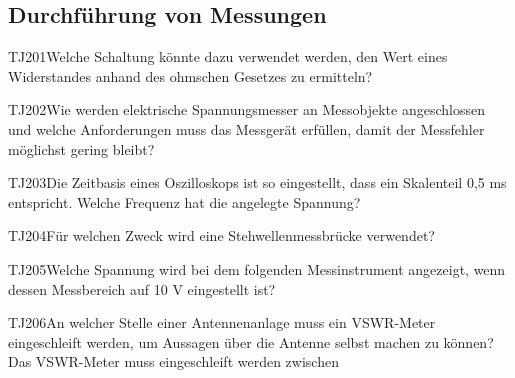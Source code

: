 \subsection{Durchführung von Messungen}

\begin{question}{TJ201}{Welche Schaltung könnte dazu verwendet werden, den Wert eines Widerstandes anhand des ohmschen Gesetzes zu ermitteln?}
\end{question}

\begin{question}{TJ202}{Wie werden elektrische Spannungsmesser an Messobjekte angeschlossen und welche Anforderungen muss das Messgerät erfüllen, damit der Messfehler möglichst gering bleibt?}
\end{question}

\begin{question}{TJ203}{Die Zeitbasis eines Oszilloskops ist so eingestellt, dass ein Skalenteil 0,5 ms entspricht. Welche Frequenz hat die angelegte Spannung?}
\end{question}

\begin{question}{TJ204}{Für welchen Zweck wird eine Stehwellenmessbrücke verwendet?}
\end{question}

\begin{question}{TJ205}{Welche Spannung wird bei dem folgenden Messinstrument angezeigt, wenn dessen Messbereich auf 10 V eingestellt ist?}
\end{question}

\begin{question}{TJ206}{An welcher Stelle einer Antennenanlage muss ein VSWR-Meter eingeschleift werden, um Aussagen über die Antenne selbst machen zu können? Das VSWR-Meter muss eingeschleift werden zwischen}
\end{question}

